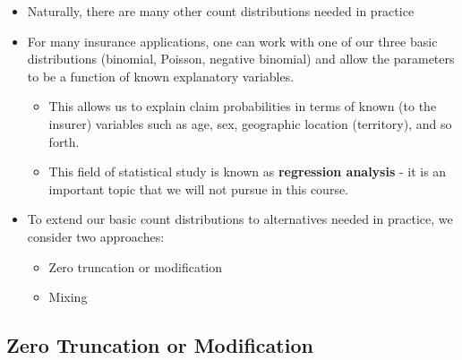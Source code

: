 \documentclass[]{book}
\theoremstyle{definition}
\theoremstyle{definition}
\theoremstyle{definition}
\theoremstyle{remark}
\begin{document}
\begin{itemize}
\item
  Naturally, there are many other count distributions needed in practice
\item
  For many insurance applications, one can work with one of our three
  basic distributions (binomial, Poisson, negative binomial) and allow
  the parameters to be a function of known explanatory variables.

  \begin{itemize}
  \item
    This allows us to explain claim probabilities in terms of known (to
    the insurer) variables such as age, sex, geographic location
    (territory), and so forth.
  \item
    This field of statistical study is known as \textbf{regression
    analysis} - it is an important topic that we will not pursue in this
    course.
  \end{itemize}
\item
  To extend our basic count distributions to alternatives needed in
  practice, we consider two approaches:

  \begin{itemize}
  \item
    Zero truncation or modification
  \item
    Mixing
  \end{itemize}
\end{itemize}

\subsection{Zero Truncation or
Modification}\label{zero-truncation-or-modification}
\end{document}
